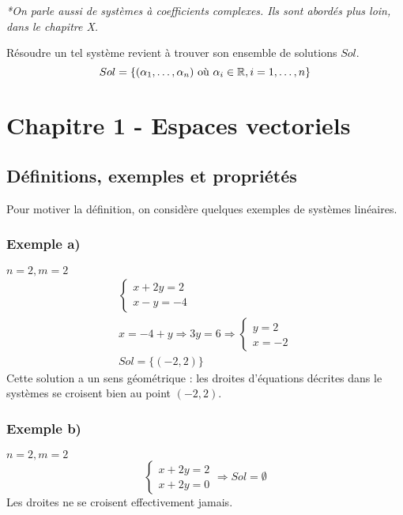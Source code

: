 \documentclass[12pt]{article}
\begin{document}
\textit{*On parle aussi de systèmes à coefficients complexes. Ils sont abordés plus loin, dans le chapitre X.}

Résoudre un tel système revient à trouver son ensemble de solutions $Sol$.
$$Sol = \{(\alpha_1, \dots, \alpha_n) \text{ où } \alpha_i \in \mathbb{R}, i = 1, \dots, n\}$$
\pagebreak
\section{Chapitre 1 - Espaces vectoriels}
\subsection{Définitions, exemples et propriétés}
Pour motiver la définition, on considère quelques exemples de systèmes linéaires.
\subsubsection*{Exemple a)}
$n=2, m=2$
$$\begin{aligned}
\begin{cases}
    x+2y = 2 \\
    x-y=-4
\end{cases}
\\
x = -4+y \Rightarrow 3y = 6 \Rightarrow \begin{cases} y = 2 \\ x = -2 \end{cases}
\\
Sol = \{(-2, 2)\}
\end{aligned}
$$
Cette solution a un sens géométrique : les droites d'équations décrites dans le systèmes se croisent bien au point $(-2, 2)$.
\\
\begin{center}
\end{center}
\pagebreak
\subsubsection*{Exemple b)}
$n=2, m=2$
$$
\begin{cases}
    x+2y = 2 \\
    x+2y= 0
\end{cases} \Rightarrow Sol = \emptyset
$$
Les droites ne se croisent effectivement jamais.
\begin{center}
\end{center}
\pagebreak
\end{document}
